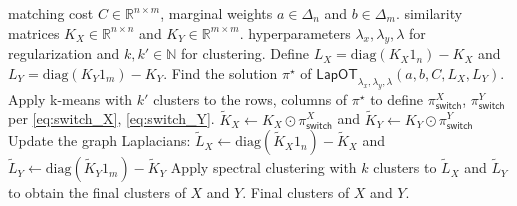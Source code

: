 \documentclass{article}
\theoremstyle{definition}
\newcommand{\N}{\mathbb{N}}
\begin{document}
\begin{algorithm}[!htbp]
    \caption{Refined Simultaneous Clustering}
    \label{alg:RSC}
    \begin{algorithmic}[1]
        \Input matching cost $C \in \mathbb{R}^{n \times m}$, marginal weights $a \in \Delta_n$ and $b \in \Delta_m$.
        \Input similarity matrices $K_X \in \mathbb{R}^{n \times n}$ and $K_Y \in \mathbb{R}^{m \times m}$.
        \Input hyperparameters $\lambda_x, \lambda_y, \lambda$ for regularization and $k, k' \in \N$ for clustering.        
        \State Define $L_X = \mathrm{diag}(K_X 1_n) - K_X$ and $L_Y = \mathrm{diag}(K_Y 1_m) - K_Y$.
        \State Find the solution $\pi^\star$ of $\mathsf{LapOT}_{\lambda_x, \lambda_y, \lambda}(a, b, C, L_X, L_Y)$.
        \State Apply k-means with $k'$ clusters to the rows, columns of $\pi^\star$ to define $\pi_{\mathsf{switch}}^X$, $\pi_{\mathsf{switch}}^Y$ per \eqref{eq:switch_X}, \eqref{eq:switch_Y}.
        \State $\tilde{K}_X \gets K_X \odot \pi_{\mathsf{switch}}^X$ and $\tilde{K}_Y \gets K_Y \odot \pi_{\mathsf{switch}}^Y$
        \State Update the graph Laplacians: $\tilde{L}_X \gets \mathrm{diag}(\tilde{K}_X 1_n) - \tilde{K}_X$ and $\tilde{L}_Y \gets \mathrm{diag}(\tilde{K}_Y 1_m) - \tilde{K}_Y$
        \State Apply spectral clustering with $k$ clusters to $\tilde{L}_X$ and $\tilde{L}_Y$ to obtain the final clusters of $X$ and $Y$.
        \Output Final clusters of $X$ and $Y$.
    \end{algorithmic}
\end{algorithm}
\end{document}
